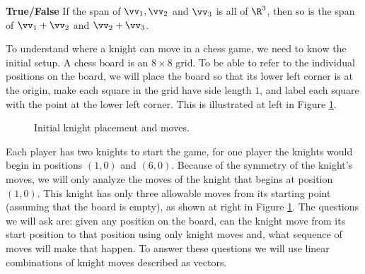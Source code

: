 \item \textbf{True/False} If the span of $\vv_1, \vv_2$ and $\vv_3$ is all of $\R^3$, then so is the span of $\vv_1+\vv_2$ and $\vv_2+\vv_3$.

\ea
\ee


To understand where a knight can move in a chess game, we need to know the initial setup. A chess board is an $8 \times 8$ grid. To be able to refer to the individual positions on the board, we will place the board so that its lower left corner is at the origin, make each square in the grid have side length $1$, and label each square with the point at the lower left corner. This is illustrated at left in Figure \ref{F:knight_2}. 

\begin{figure}[h]
\begin{center}
 \hspace{0.2in} 
\caption{Initial knight placement and moves.}
\label{F:knight_2}
\end{center}
\end{figure}

Each player has two knights to start the game, for one player the knights would begin in positions $(1,0)$ and $(6,0)$. Because of the symmetry of the knight's moves, we will only analyze the moves of the knight that begins at position $(1,0)$. This knight has only three allowable moves from its starting point (assuming that the board is empty), as shown at right in Figure \ref{F:knight_2}. The questions we will ask are: given any position on the board, can the knight move from its start position to that position using only knight moves and, what sequence of moves will make that happen. To answer these questions we will use linear combinations of knight moves described as vectors.

